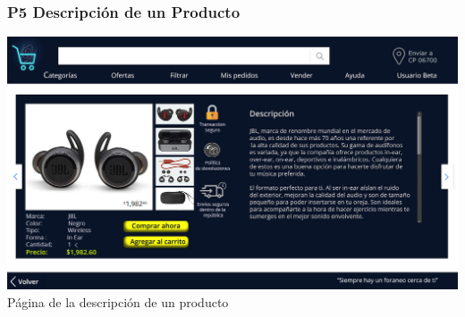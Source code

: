 \documentclass[14pt]{article}
\begin{document}
            \subsubsection{P5 Descripción de un Producto}\label{P5 Descripción de un Producto}
                \begin{center}
                    \includegraphics[height=0.55\textwidth]{DescripcionDeProducto.jpg}
                    \label{fig:DescripcionDeProducto} \\ [Figura 6] Página de la descripción de un producto
                \end{center}
\end{document}
